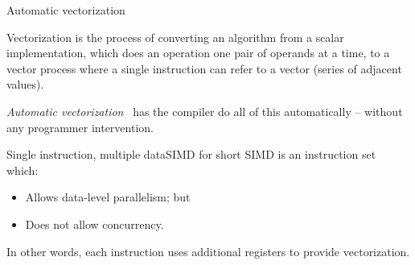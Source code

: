 \documentclass[serif, xcolor={svgnames, table}, usepdftitle=false]{beamer}
\begin{document}
\begin{frame}{Automatic vectorization}
  \begin{definition}[Vectorization]
    Vectorization is the process of converting an algorithm from a
    scalar implementation, which does an operation one pair of
    operands at a time, to a vector process where a single instruction
    can refer to a vector (series of adjacent values).
  \end{definition}

  \emph{Automatic vectorization}~\autocite{Sabahi:2012:GAV} has the
  compiler do all of this \alert{automatically} -- without any
  programmer intervention.
\end{frame}

\begin{frame}{Single instruction, multiple data}{SIMD for short}
  SIMD is an instruction set~\autocite{Hennesy:2011:CA} which:
  \begin{itemize}
  \item Allows data-level parallelism; but
  \item Does not allow concurrency.
  \end{itemize}

  In other words, each instruction uses additional registers to
  provide vectorization.
\end{frame}
\end{document}
